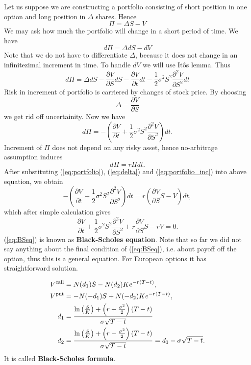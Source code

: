 \documentclass[a4paper,12pt, twoside]{article}
\theoremstyle{definition}
\theoremstyle{remark}
\begin{document}
Let us suppose we are constructing a portfolio consisting of short position in one option and long position in $\Delta$ shares. Hence
\begin{equation}
 \label{eq:portfolio}
  \Pi = \Delta S - V 
\end{equation}
We may ask how much the portfolio will change in a short period of time. We have
\[ d\Pi = \Delta dS - dV  \]
Note that we do not have to differentiate $\Delta$, because it does not change in an infinitezimal increment in time. To handle $dV$ we will use It\^{o}s lemma. Thus
\[ d\Pi = \Delta dS - \frac{\partial V}{\partial S}dS - \frac{\partial V}{\partial t}dt - \frac{1}{2}\sigma^2 S^2 \frac{\partial^2 V}{\partial S^2}dt  \]
Risk in increment of portfolio is carriered by changes of stock price. By choosing
\begin{equation}
 \label{eq:delta}
 \Delta = \frac{\partial V}{\partial S}
\end{equation}
we get rid off uncertainity. Now we have
\begin{equation}
  \label{eq:portfolio_inc}
 d\Pi = -(\frac{\partial V}{\partial t} + \frac{1}{2}\sigma^2 S^2 \frac{\partial^2 V}{\partial S^2})dt.
\end{equation}
Increment of $\Pi$ does not depend on any risky asset, hence no-arbitrage assumption induces
\[ d\Pi = r\Pi dt. \]
After substituting (\ref{eq:portfolio}), (\ref{eq:delta}) and (\ref{eq:portfolio_inc}) into above equation, we obtain
\[ -(\frac{\partial V}{\partial t} + \frac{1}{2}\sigma^2 S^2 \frac{\partial^2 V}{\partial S^2})dt = r(\frac{\partial V}{\partial S} S - V)dt, \]
which after simple calculation gives
\begin{equation}
 \label{eq:BSeq}
 \frac{\partial V}{\partial t} + \frac{1}{2}\sigma^2 S^2 \frac{\partial^2 V}{\partial S^2} + r\frac{\partial V}{\partial S} S - rV = 0.
\end{equation}
(\ref{eq:BSeq}) is known as \textbf{Black-Scholes equation}. Note that so far we did not say anything about the final condition of (\ref{eq:BSeq}), i.e. about payoff off the option, thus this is a general equation. For European options it has straightforward solution.

\begin{align*}
V\textsuperscript{call} &= N(d_1)S  - N(d_2)K e^{-r(T-t)},\\
V\textsuperscript{put} &= -N(-d_1)S + N(-d_2)K e^{-r(T-t)},\\
d_1 &= \frac{\ln\left(\frac{S}{K}\right)+\left(r+\frac{\sigma^{2}}{2}\right)(T-t)}{\sigma\sqrt{T-t}}\\
d_2 &= \frac{\ln\left(\frac{S}{K}\right)+\left(r-\frac{\sigma^{2}}{2}\right)(T-t)}{\sigma\sqrt{T-t}} = d_{1}-\sigma\sqrt{T-t}.
\end{align*}
It is called \textbf{Black-Scholes formula}.
\end{document}
